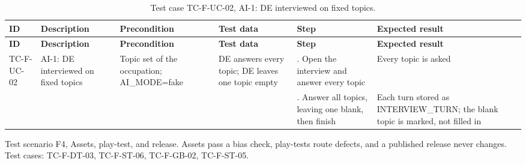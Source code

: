 {\footnotesize{}\renewcommand{\arraystretch}{1.1}
\begin{longtable}{|>{\raggedright\arraybackslash}p{}|>{\raggedright\arraybackslash}p{}|>{\raggedright\arraybackslash}p{}|>{\raggedright\arraybackslash}p{}|>{\raggedright\arraybackslash}p{}|>{\raggedright\arraybackslash}p{}|}
\caption{Test case TC-F-UC-02, AI-1: DE interviewed on fixed topics.} \\
\hline
\textbf{ID} & \textbf{Description} & \textbf{Precondition} & \textbf{Test data} & \textbf{Step} & \textbf{Expected result} \\ \hline
\endfirsthead
\hline
\textbf{ID} & \textbf{Description} & \textbf{Precondition} & \textbf{Test data} & \textbf{Step} & \textbf{Expected result} \\ \hline
\endhead
TC-F-UC-02 & AI-1: DE interviewed on fixed topics & Topic set of the occupation; AI\_\allowbreak{}MODE=fake & DE answers every topic; DE leaves one topic empty & 1. Open the interview and answer every topic & Every topic is asked \\ \cline{5-6}
 &  &  &  & 2. Answer all topics, leaving one blank, then finish & Each turn stored as INTERVIEW\_\allowbreak{}TURN; the blank topic is marked, not filled in \\ \hline
\end{longtable}
}

Test scenario F4, Assets, play-test, and release. Assets pass a bias check, play-tests route defects, and a published release never changes. Test cases: TC-F-DT-03, TC-F-ST-06, TC-F-GB-02, TC-F-ST-05.

